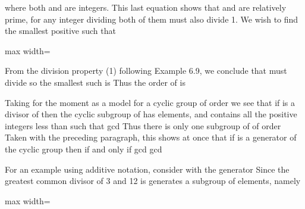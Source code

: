 \documentclass[11pt,oneside]{article}
\begin{document}
\begin{BookBody}
\noindent where both  and  are integers. This last equation shows that  and  are relatively prime, for any integer dividing both of them must also divide 1. We wish to find the smallest positive  such that

\begin{center}\begin{adjustbox}{max width=\linewidth}\end{adjustbox}\end{center}

\noindent From the division property (1) following Example 6.9, we conclude that  must divide  so the smallest such  is  Thus the order of  is 

Taking for the moment  as a model for a cyclic group of order  we see that if  is a divisor of  then the cyclic subgroup  of  has  elements, and contains all the positive integers  less than  such that gcd Thus there is only one subgroup of  of order  Taken with the preceding paragraph, this shows at once that if  is a generator of the cyclic group  then  if and only if gcd gcd\BookEnd{\blacklozenge}

 For an example using additive notation, consider  with the generator  Since the greatest common divisor of 3 and 12 is  generates a subgroup of  elements, namely

\begin{center}\begin{adjustbox}{max width=\linewidth}\end{adjustbox}\end{center}


\end{BookBody}
\end{document}
